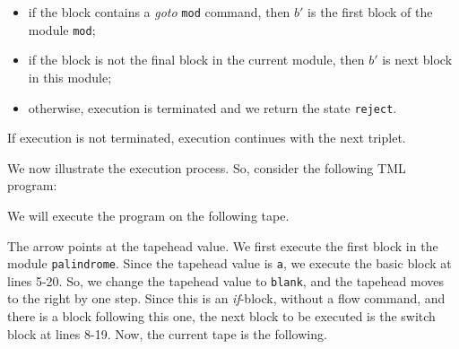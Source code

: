 \begin{appendices}
\begin{itemize}
\begin{itemize}
\begin{itemize}
            \item if the block contains a \textit{goto} \texttt{mod} command, then $b'$ is the first block of the module \texttt{mod};
            \item if the block is not the final block in the current module, then $b'$ is next block in this module;
            \item otherwise, execution is terminated and we return the state \texttt{reject}.
        \end{itemize}
    \end{itemize}
    If execution is not terminated, execution continues with the next triplet.
\end{itemize}

We now illustrate the execution process. So, consider the following TML program:

We will execute the program on the following tape.
\begin{figure}[H]
    \centering
\end{figure}
\noindent The arrow points at the tapehead value. We first execute the first block in the module \texttt{palindrome}. Since the tapehead value is \texttt{a}, we execute the basic block at lines 5-20. So, we change the tapehead value to \texttt{blank}, and the tapehead moves to the right by one step. Since this is an \textit{if}-block, without a flow command, and there is a block following this one, the next block to be executed is the switch block at lines 8-19. Now, the current tape is the following.
\begin{figure}[H]
    \centering
\end{figure}
\end{appendices}
